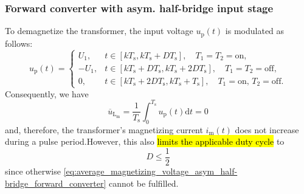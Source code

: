 \begin{frame}
    \frametitle{Forward converter with asym. half-bridge input stage}
    To demagnetize the transformer, the input voltage $u_\mathrm{p}(t)$ is modulated as follows:
    \begin{equation}
        u_\mathrm{p}(t) = \begin{cases}
            U_1, &  t\in[kT_\mathrm{s}, kT_\mathrm{s}+D T_\mathrm{s}], \quad T_1=T_2=\mathrm{on},\\
            -U_1, & t\in[kT_\mathrm{s}+D T_\mathrm{s}, kT_\mathrm{s}+2D T_\mathrm{s}], \quad  T_1=T_2=\mathrm{off},\\
            0, &  t\in[kT_\mathrm{s}+2D T_\mathrm{s}, kT_\mathrm{s}+T_\mathrm{s}], \quad T_1=\mathrm{on},\, T_2=\mathrm{off}.
        \end{cases}  
    \end{equation}\pause
    Consequently, we have
    \begin{equation}
        \overline{u}_\mathrm{L_\mathrm{m}} = \frac{1}{T_\mathrm{s}}\int_{0}^{T_\mathrm{s}}u_\mathrm{p}(t)\mathrm{d}t = 0
    \label{eq:average_magnetizing_voltage_asym_half-bridge_forward_converter}
    \end{equation}
    and, therefore, the transformer's magnetizing current $i_\mathrm{m}(t)$ does not increase during a pulse period.\pause However, this also \hl{limits the applicable duty cycle} to 
    $$
    D\leq\frac{1}{2}
    $$
    since otherwise \eqref{eq:average_magnetizing_voltage_asym_half-bridge_forward_converter} cannot be fulfilled.
\end{frame}

